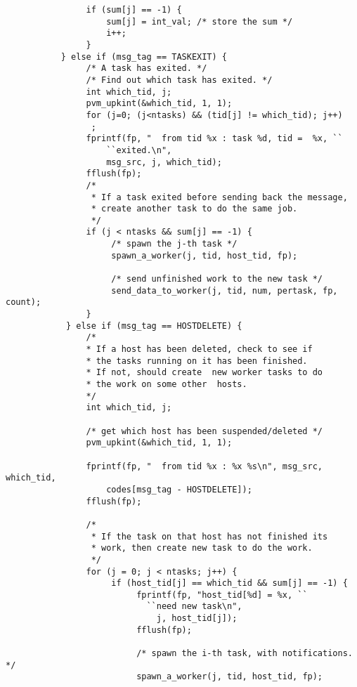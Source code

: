 \begin{verbatim}
                if (sum[j] == -1) {
                    sum[j] = int_val; /* store the sum */
                    i++;
                }
           } else if (msg_tag == TASKEXIT) {
                /* A task has exited. */
                /* Find out which task has exited. */ 
                int which_tid, j;          
                pvm_upkint(&which_tid, 1, 1);
                for (j=0; (j<ntasks) && (tid[j] != which_tid); j++)
                 ;
                fprintf(fp, "  from tid %x : task %d, tid =  %x, ``
                    ``exited.\n", 
                    msg_src, j, which_tid);
                fflush(fp);
                /* 
                 * If a task exited before sending back the message,
                 * create another task to do the same job.
                 */
                if (j < ntasks && sum[j] == -1) {
                     /* spawn the j-th task */
                     spawn_a_worker(j, tid, host_tid, fp);
                     
                     /* send unfinished work to the new task */
                     send_data_to_worker(j, tid, num, pertask, fp, count);
                }
            } else if (msg_tag == HOSTDELETE) {
                /* 
                * If a host has been deleted, check to see if 
                * the tasks running on it has been finished.  
                * If not, should create  new worker tasks to do 
                * the work on some other  hosts.
                */
                int which_tid, j;
                    
                /* get which host has been suspended/deleted */
                pvm_upkint(&which_tid, 1, 1);
                    
                fprintf(fp, "  from tid %x : %x %s\n", msg_src, which_tid, 
                    codes[msg_tag - HOSTDELETE]);
                fflush(fp);
                    
                /* 
                 * If the task on that host has not finished its
                 * work, then create new task to do the work.
                 */
                for (j = 0; j < ntasks; j++) {
                     if (host_tid[j] == which_tid && sum[j] == -1) {
                          fprintf(fp, "host_tid[%d] = %x, ``
                            ``need new task\n",
                              j, host_tid[j]);
                          fflush(fp);
                          
                          /* spawn the i-th task, with notifications. */
                          spawn_a_worker(j, tid, host_tid, fp);
                          

\end{verbatim}
